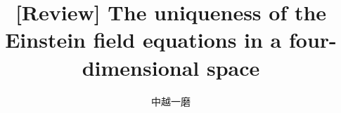 \documentclass[twocolumn, 9pt]{jarticle}
\title{[Review] The uniqueness of the Einstein field equations in a four-dimensional space}
\author{中越一磨}
\begin{document}
\maketitle

\section{}

\begin{thebibliography}{9}
\end{thebibliography}
\end{document}

